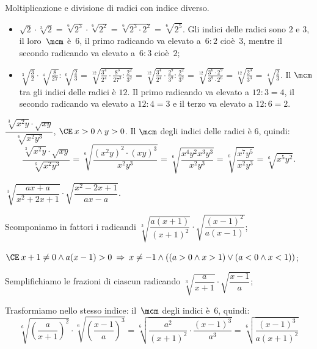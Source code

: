 \begin{exrig}
 \begin{esempio}
Moltiplicazione e divisione di radici con indice diverso.
\begin{itemize}
\item $\sqrt 2\cdot \sqrt[3]2=\sqrt[6]{2^3}\cdot \sqrt[6]{2^2}=\sqrt[6]{2^3\cdot 2^2}=\sqrt[6]{2^5}$. Gli indici delle radici sono $2$ e $3$, il loro~$\mcm$ è~$6$, il primo radicando va elevato a~$6:2$ cioè~$3$, mentre il secondo radicando va elevato a~$6:3$ cioè~$2$;
\item $\sqrt[3]{\frac 3 2}\cdot \sqrt[4]{\frac 8{27}}:\sqrt[6]{\frac 2 3}=\sqrt[12]{\frac{3^4}{2^4}\cdot \frac{8^3}{27^3}:\frac{2^2}{3^2}}=\sqrt[12]{\frac{3^4}{2^4}\cdot \frac{2^9}{3^9}:\frac{2^2}{3^2}}=\sqrt[12]{\frac{3^6\cdot 2^9}{3^9\cdot 2^6}}=\sqrt[12]{\frac{2^3}{3^3}}=\sqrt[4]{\frac 2 3}$. Il $\mcm$ tra gli indici delle radici è $12$. Il primo radicando va elevato a $12:3=4$, il secondo radicando va elevato a $12:4=3$ e il terzo va elevato a $12:6=2$.
\end{itemize}
 \end{esempio}

\begin{esempio}
 $\dfrac{\sqrt[3]{x^2y}\cdot \sqrt{xy}}{\sqrt[6]{x^2y^3}}$, $\CE\: x>0\wedge y>0$.
Il $\mcm$ degli indici delle radici è $6$, quindi:
\[
\frac{\sqrt[3]{x^2y}\cdot \sqrt{\mathit{xy}}}{\sqrt[6]{x^2y^3}}=\sqrt[6]{\frac{\left(x^2y\right)^2\cdot (xy)^3}{x^2y^3}}=\sqrt[6]{\frac{x^4y^2x^3y^3}{x^2y^3}}=\sqrt[6]{\frac{x^7y^5}{x^2y^3}}=\sqrt[6]{x^5y^2}.
\]
\end{esempio}

\begin{esempio}
 $\sqrt[3]{\dfrac{ax+a}{x^2+2x+1}}\cdot \sqrt{\dfrac{x^2-2x+1}{ax-a}}$.
\begin{enumeratea}
\item Scomponiamo in fattori i radicandi $\sqrt[3]{\dfrac{a(x+1)}{(x+1)^2}}\cdot \sqrt{\dfrac{(x-1)^2}{a(x-1)}}$;
\item $\CE\: x+1\neq 0\wedge a(x-1)>0\:\Rightarrow\: x\neq -1\wedge ((a>0\wedge x>1)\vee (a<0\wedge x<1))$;
\item Semplifichiamo le frazioni di ciascun radicando $\sqrt[3]{\dfrac a{x+1}}\cdot \sqrt{\dfrac{x-1} a}$;
\item Trasformiamo nello stesso indice: il~$\mcm$ degli indici è~$6$, quindi:
\[
\sqrt[6]{\left(\dfrac a{x+1}\right)^2}\cdot \sqrt[6]{\left(\dfrac{x-1} a\right)^3}=\sqrt[6]{\dfrac{a^2}{(x+1)^2}\cdot \dfrac{(x-1)^3}{a^3}}=\sqrt[6]{\dfrac{(x-1)^3}{a(x+1)^2}}
\]
\end{enumeratea}
\end{esempio}


\end{exrig}
